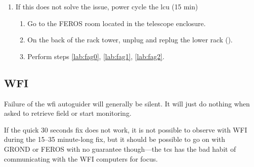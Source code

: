 \documentclass[11pt,fleqn,a4paper]{book}
\begin{document}
\begin{enumerate}
    \begin{enumerate}
       \item Go to the FEROS room located in the telescope enclosure. 
       \item Locate the big blue rack tower ().
       \item On the lower racks, near to l2p2cam label, push a small RST button ().
       \item Perform steps \ref{lab:fag0}, \ref{lab:fag1}, \ref{lab:fag2}.
    \end{enumerate}
    \item If this does not solve the issue, \gls{power cycle} the \gls{lcu} (15 min)
    \begin{enumerate}
        \item Go to the FEROS room located in the telescope enclosure. 
        \item On the back of the rack tower, unplug and replug the lower rack ().
        \item Perform steps \ref{lab:fag0}, \ref{lab:fag1}, \ref{lab:fag2}.
    \end{enumerate}
\end{enumerate}



\subsection{WFI}
Failure of the \gls{wfi} autoguider will generally be silent.  It will just do nothing when asked to retrieve field or start monitoring.

If the quick 30 seconds fix does not work, it is not possible to observe with WFI during the 15--35 minute-long fix, but it should be possible to go on with GROND or FEROS with no guarantee though---the \gls{tcs} has the bad habit of communicating with the WFI computers for \gls{focus}.\\
\end{document}
